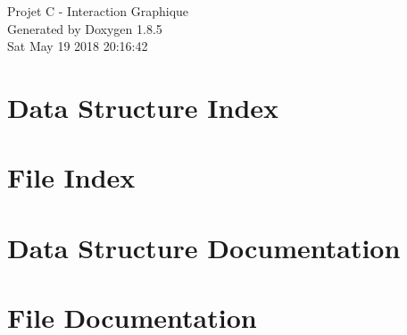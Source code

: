 \documentclass[twoside]{book}
\newcommand{\clearemptydoublepage}{%
  \newpage{\pagestyle{empty}\cleardoublepage}%
}
\begin{document}
\hypersetup{pageanchor=false}
\begin{titlepage}
\vspace*{7cm}
\begin{center}%
{\Large Projet C -\/ Interaction Graphique }\\
\vspace*{1cm}
{\large Generated by Doxygen 1.8.5}\\
\vspace*{0.5cm}
{\small Sat May 19 2018 20:16:42}\\
\end{center}
\end{titlepage}
\clearemptydoublepage
\tableofcontents
\clearemptydoublepage
{}
\hypersetup{pageanchor=true}

\chapter{Data Structure Index}

\chapter{File Index}

\chapter{Data Structure Documentation}
















\chapter{File Documentation}



















\newpage
{}
{}
\printindex
\end{document}
